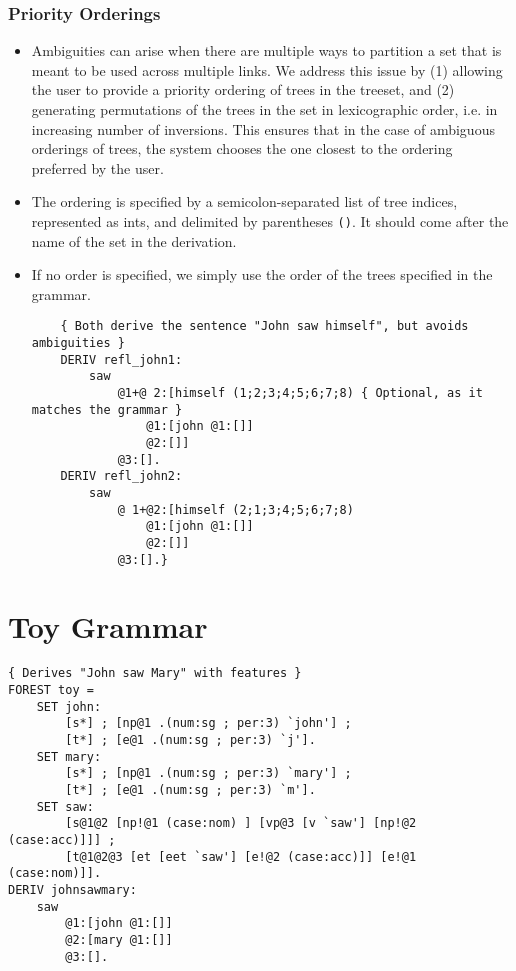 \documentclass[10.5pt]{article}
\newcommand{\code}[1]{\texttt{#1}}
\begin{document}
\subsubsection{Priority Orderings}
  \begin{itemize}
	\item Ambiguities can arise when there are multiple ways to partition a set that is meant to be used across multiple links. We address this issue by (1) allowing the user to provide a priority ordering of trees in the treeset, and (2) generating permutations of the trees in the set in lexicographic order, i.e. in increasing number of inversions. This ensures that in the case of ambiguous orderings of trees, the system chooses the one closest to the ordering preferred by the user.
	\item The ordering is specified by a semicolon-separated list of tree indices, represented as ints, and delimited by parentheses \code{()}. It should come after the name of the set in the derivation.
	\item If no order is specified, we simply use the order of the trees specified in the grammar.

	\begin{mdframed}[backgroundcolor=blue!5]
	\begin{verbatim}
	{ Both derive the sentence "John saw himself", but avoids ambiguities }
	DERIV refl_john1:
	    saw
	        @1+@￼2:[himself (1;2;3;4;5;6;7;8) { Optional, as it matches the grammar }
	            @1:[john @1:[]]
	            @2:[]]
	        @3:[].
	DERIV refl_john2:
	    saw
	        @￼1+@2:[himself (2;1;3;4;5;6;7;8)
	            @1:[john @1:[]]
	            @2:[]]
	        @3:[].}
	\end{verbatim}
	\end{mdframed}
  \end{itemize}

\section{Toy Grammar}

\begin{mdframed}[backgroundcolor=blue!5]
\begin{verbatim}
{ Derives "John saw Mary" with features }
FOREST toy =
    SET john:
        [s*] ; [np@1 .(num:sg ; per:3) `john'] ;
        [t*] ; [e@1 .(num:sg ; per:3) `j'].
    SET mary:
        [s*] ; [np@1 .(num:sg ; per:3) `mary'] ;
        [t*] ; [e@1 .(num:sg ; per:3) `m'].
    SET saw:
        [s@1@2 [np!@1 (case:nom) ] [vp@3 [v `saw'] [np!@2 (case:acc)]]] ;
        [t@1@2@3 [et [eet `saw'] [e!@2 (case:acc)]] [e!@1 (case:nom)]].
DERIV johnsawmary:
    saw
        @1:[john @1:[]]
        @2:[mary @1:[]]
        @3:[].
\end{verbatim}
\end{mdframed}
\end{document}
